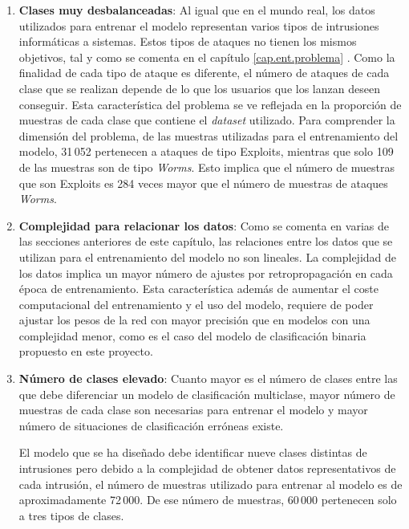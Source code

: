 \begin{enumerate}
	\item \textbf{Clases muy desbalanceadas}: Al igual que en el mundo real, los datos utilizados para entrenar el modelo representan varios tipos de intrusiones informáticas a sistemas. Estos tipos de ataques no tienen los mismos objetivos, tal y como se comenta en el capítulo \ref{cap.ent.problema} . Como la finalidad de cada tipo de ataque es diferente, el número de ataques de cada clase que se realizan depende de lo que los usuarios que los lanzan deseen conseguir. Esta característica del problema se ve reflejada en la proporción de muestras de cada clase que contiene el \textit{dataset} utilizado. Para comprender la dimensión del problema, de las muestras utilizadas para el entrenamiento del modelo, 31\,052 pertenecen a ataques de tipo Exploits, mientras que solo 109 de las muestras son de tipo \textit{Worms}. Esto implica que el número de muestras que son Exploits es 284 veces mayor que el número de muestras de ataques \textit{Worms}.
	
	\item \textbf{Complejidad para relacionar los datos}: Como se comenta en varias de las secciones anteriores de este capítulo, las relaciones entre los datos que se utilizan para el entrenamiento del modelo no son lineales. La complejidad de los datos implica un mayor número de ajustes por retropropagación en cada época de entrenamiento. Esta característica además de aumentar el coste computacional del entrenamiento y el uso del modelo, requiere de poder ajustar los pesos de la red con mayor precisión que en modelos con una complejidad menor, como es el caso del modelo de clasificación binaria propuesto en este proyecto.
	
	\item \textbf{Número de clases elevado}: Cuanto mayor es el número de clases entre las que debe diferenciar un modelo de clasificación multiclase, mayor número de muestras de cada clase son necesarias para entrenar el modelo y mayor número de situaciones de clasificación erróneas existe. 
	
	El modelo que se ha diseñado debe identificar nueve clases distintas de intrusiones pero debido a la complejidad de obtener datos representativos de cada intrusión, el número de muestras utilizado para entrenar al modelo es de aproximadamente 72\,000. De ese número de muestras, 60\,000 pertenecen solo a tres tipos de clases.
	

\end{enumerate}
